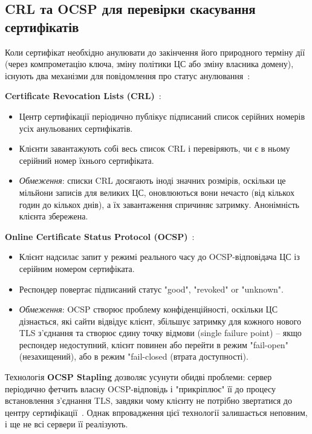 \subsection{CRL та OCSP для перевірки скасування сертифікатів}

Коли сертифікат необхідно анулювати до закінчення його природного терміну дії (через компрометацію ключа, зміну 
політики ЦС або зміну власника домену), існують два механізми для повідомлення про статус анулювання~\cite{rfc5280, rfc6960}:

\textbf{Certificate Revocation Lists (CRL)}~\cite{rfc5280}:
\begin{itemize}
    \item Центр сертифікації періодично публікує підписаний список серійних номерів усіх анульованих сертифікатів.
    \item Клієнти завантажують собі весь список CRL і перевіряють, чи є в ньому серійний номер їхнього сертифіката.
    \item \textit{Обмеження}: списки CRL досягають іноді значних розмірів, оскільки це мільйони записів для великих ЦС, 
        оновлюються вони нечасто (від кількох годин до кількох днів), а їх завантаження спричиняє затримку. Анонімність 
        клієнта збережена.
\end{itemize}

\textbf{Online Certificate Status Protocol (OCSP)}~\cite{rfc6960}:
\begin{itemize}
    \item Клієнт надсилає запит у режимі реального часу до OCSP-відповідача ЦС із серійним номером сертифіката.
    \item Респондер повертає підписаний статус "good"{}, "revoked"{} or "unknown"{}.
    \item \textit{Обмеження}: OCSP створює проблему конфіденційності, оскільки ЦС дізнається, які сайти відвідує 
        клієнт, збільшує затримку для кожного нового TLS з'єднання та створює єдину точку відмови (single failure point) 
        -- якщо респондер недоступний, клієнт повинен або перейти в режим "fail-open"{} (незахищений), або в режим 
        "fail-closed{} (втрата доступності).
\end{itemize}

Технологія \textbf{OCSP Stapling} дозволяє усунути обидві проблеми: сервер періодично фетчить власну OCSP-відповідь 
і "прикріплює"{} її до процесу встановлення з'єднання TLS, завдяки чому клієнту не потрібно звертатися до центру 
сертифікації~\cite{mozilla_server_side_tls}. Однак впровадження цієї технології залишається неповним, і ще 
не всі сервери її реалізують.

